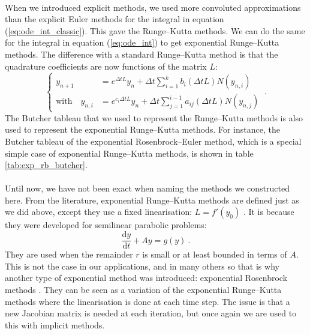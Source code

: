     \paragraph{}
    When we introduced explicit methods, we used more convoluted approximations than the explicit Euler methods for the integral in equation (\ref{eq:ode_int_classic}).
    This gave the Runge--Kutta methods.
    We can do the same for the integral in equation (\ref{eq:ode_int}) to get exponential Runge--Kutta methods.
    The difference with a standard Runge--Kutta method is that the quadrature coefficients are now functions of the matrix $L$:
    \begin{equation}
      \left\{\begin{aligned}
        y_{n+1} &= e^{\Delta t L} y_n + \Delta t \sum_{i = 1}^k b_i\left(\Delta t L\right) N\left(y_{n,i}\right) \\
        \textrm{with}\quad y_{n,i} &= e^{c_i \Delta t L} y_n + \Delta t \sum_{j = 1}^{i-1} a_{ij}\left(\Delta t L\right) N\left(y_{n,j}\right)
      \end{aligned}\right. \ .
    \end{equation}
    The Butcher tableau that we used to represent the Runge--Kutta methods is also used to represent the exponential Runge--Kutta methods.
    For instance, the Butcher tableau of the exponential Rosenbrock--Euler method, which is a special simple case of exponential Runge--Kutta methods, is shown in table \ref{tab:exp_rb_butcher}.

    \paragraph{}
    Until now, we have not been exact when naming the methods we constructed here.
    From the literature, exponential Runge--Kutta methods are defined just as we did above, except they use a fixed linearisation: $L = f'\left(y_0\right)$ \cite{HochbruckOstermann2005}.
    It is because they were developed for semilinear parabolic problems:
    \begin{equation}
      \frac{\mathrm{d} y}{\mathrm{d} t} + Ay = g\left(y\right) \ .
    \end{equation}
    They are used when the remainder $r$ is small or at least bounded in terms of $A$.
    This is not the case in our applications, and in many others so that is why another type of exponential method was introduced: exponential Rosenbrock methods \cite{HochbruckOstermannSchweitzer2006}.
    They can be seen as a variation of the exponential Runge--Kutta methods where the linearisation is done at each time step.
    The issue is that a new Jacobian matrix is needed at each iteration, but once again we are used to this with implicit methods.

